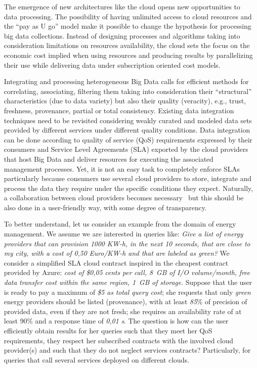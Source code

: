 The emergence of new architectures like the cloud opens new opportunities to data processing. 
The possibility of having unlimited access to cloud resources and the ``pay as U go'' model make it possible to change the hypothesis for processing big  data collections.  Instead of designing processes and algorithms taking into consideration  limitations on resources availability, the cloud sets the focus on the economic cost implied when using resources and producing results by parallelizing their use while delivering data under subscription oriented cost models.
 
Integrating and processing heterogeneous Big Data calls for efficient methods for correlating, associating, filtering them taking into consideration their ``structural'' characteristics (due to data variety) but also their quality (veracity), e.g., trust, freshness, provenance, partial or total consistency. 
Existing data integration techniques need to be revisited considering weakly curated and modeled data sets provided by different services under different quality conditions. Data integration can be done according to quality of service (QoS) requirements expressed by their consumers and Service Level Agreements (SLA)  exported by the cloud providers that host  Big Data and deliver resources for executing the associated management processes. Yet, it is not an easy task to completely enforce SLAs particularly because consumers use several cloud providers to store, integrate and process the data they require under the specific conditions they expect.
Naturally, a collaboration between cloud providers becomes necessary~\cite{036} but this should be also done in a user-friendly way, with some degree of transparency. 

To better understand, let us consider an example from the domain of energy
management. We assume we are interested in queries like: \textit{Give a list
of energy providers that can provision 1000 KW-h, in the next 10 seconds, that are close to my city, with a cost of 0,50 Euro/KW-h and that are labeled as green?} We consider a simplified SLA cloud contract inspired in the cheapest contract provided by Azure: \textit{cost of \$0,05 cents per call,  8~GB of I/O volume/month, free data transfer cost within the same region,  1~GB of storage.} 
Suppose that the user is ready to pay a maximum of \textit{\$5 as total query cost}; she requests that only  \textit{green} energy providers should be  listed (provenance), with at least  \textit{85$\%$} of precision of provided data, even if they are not fresh; she requires an availability rate of at least 90$\%$ and a response time of  \textit{0,01 s}. 
  The question is how can the user efficiently obtain  results for her queries such that they meet her QoS requirements, they respect her subscribed contracts with the involved cloud provider(s) and such that they do not neglect services contracts? Particularly, for queries that call several services deployed  on different clouds.

